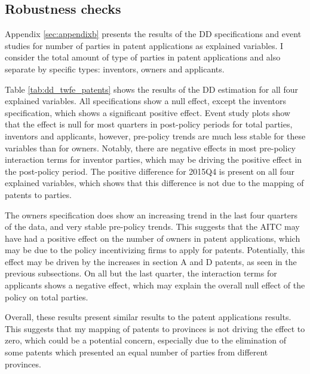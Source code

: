 \documentclass[../main.tex]{subfiles}
\begin{document}
\subsection{Robustness checks}

Appendix \ref{sec:appendixb} presents the results of the DD specifications and event studies for number of parties in patent applications as explained variables. I consider the total amount of type of parties in patent applications and also separate by specific types: inventors, owners and applicants. 

Table \ref{tab:dd_twfe_patents} shows the results of the DD estimation for all four explained variables. All specifications show a null effect, except the inventors specification, which shows a significant positive effect. Event study plots show that the effect is null for most quarters in post-policy periods for total parties, inventors and applicants, however, pre-policy trends are much less stable for these variables than for owners. Notably, there are negative effects in most pre-policy interaction terms for inventor parties, which may be driving the positive effect in the post-policy period. The positive difference for 2015Q4 is present on all four explained variables, which shows that this difference is not due to the mapping of patents to parties.

The owners specification does show an increasing trend in the last four quarters of the data, and very stable pre-policy trends. This suggests that the AITC may have had a positive effect on the number of owners in patent applications, which may be due to the policy incentivizing firms to apply for patents. Potentially, this effect may be driven by the increases in section A and D patents, as seen in the previous subsections. On all but the last quarter, the interaction terms for applicants shows a negative effect, which may explain the overall null effect of the policy on total parties.

Overall, these results present similar results to the patent applications results. This suggests that my mapping of patents to provinces is not driving the effect to zero, which could be a potential concern, especially due to the elimination of some patents which presented an equal number of parties from different provinces.
\end{document}
